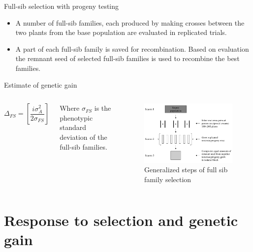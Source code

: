 \documentclass[11pt,ignorenonframetext,aspectratio=169]{beamer}
\providecommand{\tightlist}{%
  \setlength{\itemsep}{0pt}\setlength{\parskip}{0pt}}
\newcommand{\bcolumns}{\begin{columns}[T, onlytextwidth]}
\newcommand{\ecolumns}{\end{columns}}
\begin{document}
\begin{frame}{Full-sib selection with progeny testing}
\protect\hypertarget{full-sib-selection-with-progeny-testing}{}
\begin{itemize}
\tightlist
\item
  A number of full-sib families, each produced by making crosses between
  the two plants from the base population are evaluated in replicated
  trials.
\item
  A part of each full-sib family is saved for recombination. Based on
  evaluation the remnant seed of selected full-sib families is used to
  recombine the best families.
\end{itemize}
\end{frame}

\begin{frame}{Estimate of genetic gain}
\protect\hypertarget{estimate-of-genetic-gain}{}
\bcolumns
{}

\[
\Delta_{FS} = \left[\frac{i \sigma^2_A}{2 \sigma_{FS}}\right]
\]

Where \(\sigma_{FS}\) is the phenotypic standard deviation of the
full-sib families.


\begin{figure}

{\centering \includegraphics[width=0.88\linewidth]{./images/full_sib_selection} 

}

\caption{Generalized steps of full sib family selection}\label{fig:full-sib-selection}
\end{figure}

\ecolumns
\end{frame}

\hypertarget{response-to-selection-and-genetic-gain}{%
\section{Response to selection and genetic
gain}\label{response-to-selection-and-genetic-gain}}
\end{document}

